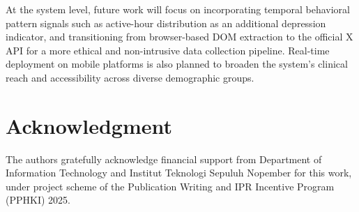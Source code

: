 \documentclass[conference]{IEEEtran}
\begin{document}
At the system level, future work will focus on incorporating temporal
behavioral pattern signals such as active-hour distribution as an
additional depression indicator, and transitioning from browser-based
DOM extraction to the official X API for a more ethical and
non-intrusive data collection pipeline. Real-time deployment on mobile
platforms is also planned to broaden the system's clinical reach and
accessibility across diverse demographic groups.

\section*{Acknowledgment}
The authors gratefully acknowledge financial support from Department of Information Technology and Institut Teknologi Sepuluh Nopember for this work, under project scheme of the Publication Writing and IPR Incentive Program (PPHKI) 2025.
\end{document}
